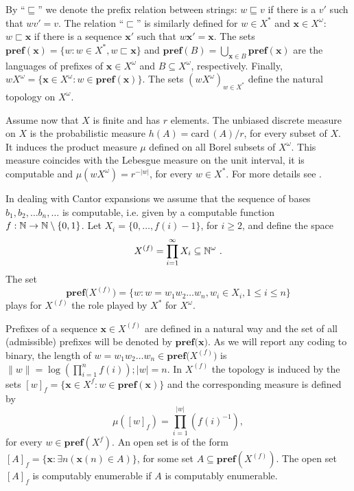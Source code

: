 \documentclass[12pt]{iopart}
\begin{document}
By ``$\sqsubseteq$'' we denote the prefix relation between strings:
$w\sqsubseteq v$ if there is a $v'$ such that $w v'= v$.  The relation
``$\sqsubset$'' is similarly defined for $w\in X^{*}$ and ${\mathbf x} \in
X^{\omega}$:
$w\sqsubset{\mathbf x}$ if there is a sequence ${\mathbf x}'$ such that $w{\mathbf x}'= {\mathbf x}$. The sets
${{\mathbf{pref}({{\mathbf x}})}} =\{w : w\in X^*,  w\sqsubset{\mathbf x}\}$
and ${{\mathbf{pref}({B})}}=\bigcup_{{\mathbf x}\in
  B}{{\mathbf{pref}({{\mathbf x}})}}$ are the languages of
prefixes of ${\mathbf x} \in X^{\omega}$ and $B
\subseteq X^{\omega} $, respectively. Finally, $wX^{\omega} = \{{\mathbf x} \in
X^{\omega} : w\in{{\mathbf{pref}({{\mathbf x}})}} \}.$
The sets $(wX^{\omega})_{w\in X^*}$ define
the
natural topology on $X^{\omega}$.

Assume now that $X$ is finite and has $r$ elements. The unbiased discrete
measure on $X$ is the probabilistic measure $h (A) =
{\mathrm{card}\,}(A)/r$, for every subset of $X$. It induces the product measure $\mu$
defined on all Borel subsets of $X^{\omega}$. This measure coincides with
the
Lebesgue measure on the unit interval, it is computable and $\mu(w
X^{\omega})
= r^{-|w|}$, for every $w \in X^{*}$. For more details see
\cite{martin-lof,mar2,calude:02}.


In dealing with  Cantor expansions we  assume that the sequence of bases
$b_1, b_2, \ldots b_n, \ldots$ is computable, i.e.  given by a computable
function  $f:{\Bbb N}\to {\Bbb N}\setminus\{0,1\}$. Let  $X_i=\{0,\dots,
f(i)-1\}$, for
$i\ge 2$,  and define the space $$X^{(f)} = \prod_{i=1}^\infty X_i\subseteq
{\Bbb N}^\omega\ .$$
The set
$${\mathbf{pref}({{X^{(f)}})}} = \{ w : w = w_1 w_2 \ldots w_n, w_i \in X_i, 1 \le i \le
n\}$$
plays for $X^{(f)}$ the role played by $X^*$ for $X^{\omega}$.

Prefixes of a sequence ${\mathbf x} \in X^{(f)}$  are defined in a natural way and
the set of all (admissible) prefixes  will be denoted by
${{\mathbf{pref}({{\mathbf x}}})}$.  As we
will report any coding to binary, the length of $w= w_1 w_2 \ldots w_n\in
{\mathbf{pref}({{X^{(f)}})}}$ is
$\parallel w \parallel = \log (\prod_{i=1}^{n} f(i)); |w| =n$. In $X^{(f)}$
the topology is induced by the
sets $[w]_{f} = \{{\mathbf x} \in X^{f} : w\in {\mathbf{pref}({{\mathbf x}})} \}$ and the corresponding measure is defined by
$$\mu([w]_{f})
= \prod_{i=1}^{|w|} (f(i)^{-1}),$$ for every $w \in {{\mathbf{pref}({X^{f}})}}$.
An open set is of the form $[A]_f = \{{\mathbf x} : \exists n ({\mathbf x}(n)\in A)\}$, for some set
$A\subseteq
{{\mathbf{pref}({{X^{(f)}}})}}$. The open set $[A]_f$ is computably enumerable if $A$ is
computably enumerable.
\end{document}
